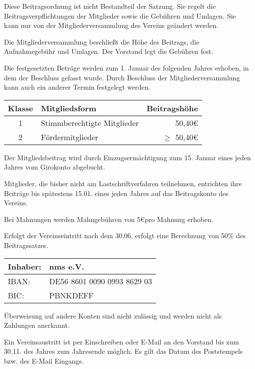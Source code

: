 \begin{beitrag}

  Diese Beitragsordnung ist nicht Bestandteil der Satzung. Sie regelt die Beitragsverpflichtungen der Mitglieder sowie die Gebühren und Umlagen. Sie kann nur von der Mitgliederversammlung des Vereins geändert werden.

  Die Mitgliederversammlung beschließt die Höhe des Beitrags, die Aufnahmegebühr und Umlagen. Der Vorstand legt die Gebühren fest.

  Die festgesetzten Beträge werden zum 1. Januar des folgenden Jahres erhoben, in dem der Beschluss gefasst wurde. Durch Beschluss der Mitgliederversammlung kann auch ein anderer Termin festgelegt werden.


  \begin{center}
    \begin{tabular}{ |c|l|r| }
      \hline
      Klasse & Mitgliedsform               & Beitragshöhe     \\
      \hline \hline
      1      & Stimmberechtigte Mitglieder & 50,40\euro       \\
      2      & Fördermitglieder            & $\ge$ 50,40\euro \\
      \hline
    \end{tabular}
  \end{center}

  Der Mitgliedsbeitrag wird durch Einzugsermächtigung zum 15. Januar eines jeden Jahres vom Girokonto abgebucht.

  Mitglieder, die bisher nicht am Lastschriftverfahren teilnehmen, entrichten ihre Beiträge bis spätestens 15.01. eines jeden Jahres auf das Beitragskonto des Vereins.

  Bei Mahnungen werden Mahngebühren von 5\euro pro Mahnung erhoben.

  Erfolgt der Vereinseintritt nach dem 30.06. erfolgt eine Berechnung von 50\% des Beitragssatzes.


  \begin{center}
    \begin{tabular}{ |ll| }
      \hline
      Inhaber: & nms e.V.                     \\
      \hline
      IBAN:    & DE56 8601 0090 0993 8629 03 \\
      \hline
      BIC:     & PBNKDEFF                    \\
      \hline
    \end{tabular}
  \end{center}

  Überweisung auf andere Konten sind nicht zulässig und werden nicht als Zahlungen anerkannt.

  Ein Vereinsaustritt ist per Einschreiben oder E-Mail an den Vorstand bis zum 30.11. des Jahres zum Jahresende möglich. Es gilt das Datum des Poststempels bzw. des E-Mail Eingangs.

\end{beitrag}

